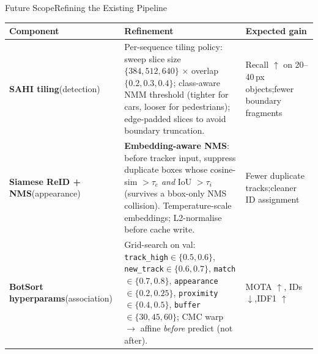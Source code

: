 \documentclass[10pt]{beamer}
\begin{document}







    
    	
	\begin{frame}{Future Scope}{Refining the Existing Pipeline}
 
\begin{table}
\centering
\footnotesize
\renewcommand{\arraystretch}{1.1}
\begin{tabular}{@{}p{2.0cm} p{6.4cm} p{3.0cm}@{}}
\toprule
\textbf{Component} & \textbf{Refinement} & \textbf{Expected gain} \\
\midrule
 
\textbf{SAHI tiling}\newline\footnotesize{(detection)}
  & Per-sequence tiling policy: sweep slice size $\{384,512,640\}$ $\times$ overlap $\{0.2,0.3,0.4\}$; class-aware NMM threshold (tighter for cars, looser for pedestrians); edge-padded slices to avoid boundary truncation.
  & Recall $\uparrow$ on 20--40\,px objects;\newline fewer boundary fragments \\
 
\textbf{Siamese ReID + NMS}\newline\footnotesize{(appearance)}
  & \textbf{Embedding-aware NMS}: before tracker input, suppress duplicate boxes whose cosine-sim $> \tau_e$ \emph{and} IoU $> \tau_i$ (survives a bbox-only NMS collision). Temperature-scale embeddings; L2-normalise before cache write.
  & Fewer duplicate tracks;\newline cleaner ID assignment \\
 
\textbf{BotSort hyperparams}\newline\footnotesize{(association)}
  & Grid-search on val:
  \texttt{track\_high}$\in\{0.5, 0.6\}$,
  \texttt{new\_track}$\in\{0.6, 0.7\}$,
  \texttt{match}$\in\{0.7, 0.8\}$,
  \texttt{appearance}$\in\{0.2, 0.25\}$,
  \texttt{proximity}$\in\{0.4, 0.5\}$,
  \texttt{buffer}$\in\{30, 45, 60\}$;
  CMC warp $\to$ affine \emph{before} predict (not after).
  & MOTA $\uparrow$, IDs $\downarrow$,\newline IDF1 $\uparrow$ \\
 
\bottomrule
\end{tabular}
\end{table}
  
\end{frame}
\end{document}
